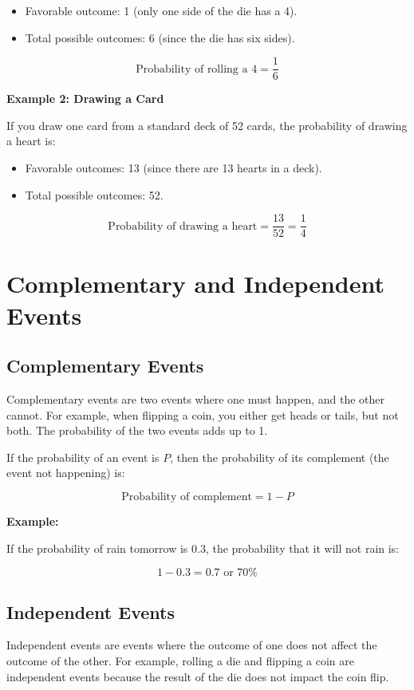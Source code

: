 \begin{itemize}
    \item Favorable outcome: 1 (only one side of the die has a 4).
    \item Total possible outcomes: 6 (since the die has six sides).
\end{itemize}

\[
\text{Probability of rolling a 4} = \frac{1}{6}
\]

\textbf{Example 2: Drawing a Card}

If you draw one card from a standard deck of 52 cards, the probability of drawing a heart is:

\begin{itemize}
    \item Favorable outcomes: 13 (since there are 13 hearts in a deck).
    \item Total possible outcomes: 52.
\end{itemize}

\[
\text{Probability of drawing a heart} = \frac{13}{52} = \frac{1}{4}
\]

\section{Complementary and Independent Events}
\subsection{Complementary Events}
Complementary events are two events where one must happen, and the other cannot. For example, when flipping a coin, you either get heads or tails, but not both. The probability of the two events adds up to 1.

If the probability of an event is $P$, then the probability of its complement (the event not happening) is:

\[
\text{Probability of complement} = 1 - P
\]

\textbf{Example:}

If the probability of rain tomorrow is 0.3, the probability that it will not rain is:

\[
1 - 0.3 = 0.7 \text{ or } 70\%
\]

\subsection{Independent Events}
Independent events are events where the outcome of one does not affect the outcome of the other. For example, rolling a die and flipping a coin are independent events because the result of the die does not impact the coin flip.

